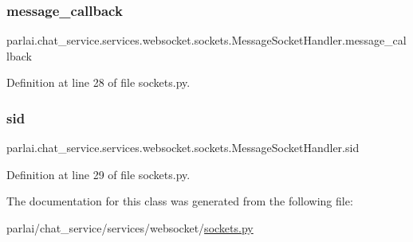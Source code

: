 \subsubsection{\texorpdfstring{message\+\_\+callback}{message\_callback}}
{\footnotesize\ttfamily parlai.\+chat\+\_\+service.\+services.\+websocket.\+sockets.\+Message\+Socket\+Handler.\+message\+\_\+callback}



Definition at line 28 of file sockets.\+py.

\mbox{\label{classparlai_1_1chat__service_1_1services_1_1websocket_1_1sockets_1_1MessageSocketHandler_a5e574f1ab05ba9d4749f4d4c2fe6e6d2}} 
\subsubsection{\texorpdfstring{sid}{sid}}
{\footnotesize\ttfamily parlai.\+chat\+\_\+service.\+services.\+websocket.\+sockets.\+Message\+Socket\+Handler.\+sid}



Definition at line 29 of file sockets.\+py.



The documentation for this class was generated from the following file\+:\begin{DoxyCompactItemize}
\item 
parlai/chat\+\_\+service/services/websocket/\hyperlink{sockets_8py}{sockets.\+py}\end{DoxyCompactItemize}
